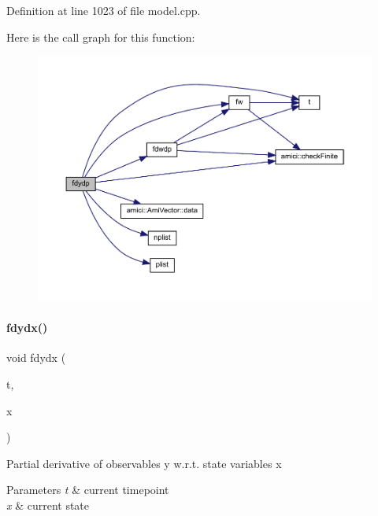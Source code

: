 Definition at line 1023 of file model.\+cpp.

Here is the call graph for this function\+:
\nopagebreak
\begin{figure}[H]
\begin{center}
\leavevmode
\includegraphics[width=350pt]{classamici_1_1_model_a322eb75785aa46abe19813b9c56d706e_cgraph}
\end{center}
\end{figure}
\mbox{\label{classamici_1_1_model_ac60c960da1c933254a92bb9b681e9426}} 
\paragraph{\texorpdfstring{fdydx()}{fdydx()}\hspace{0.1cm}{\footnotesize\ttfamily [1/2]}}
{\footnotesize\ttfamily void fdydx (\begin{DoxyParamCaption}\item[{const \mbox{\hyperlink{namespaceamici_a1bdce28051d6a53868f7ccbf5f2c14a3}{realtype}}}]{t,  }\item[{const \mbox{\hyperlink{classamici_1_1_ami_vector}{Ami\+Vector}} $\ast$}]{x }\end{DoxyParamCaption})}

Partial derivative of observables y w.\+r.\+t. state variables x 
\begin{DoxyParams}{Parameters}
{\em t} & current timepoint \\
\hline
{\em x} & current state \\
\hline
\end{DoxyParams}


